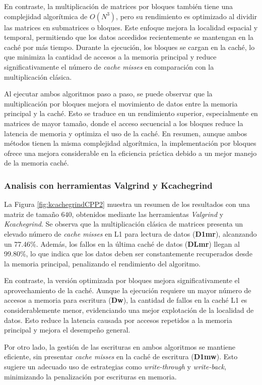 \documentclass[conference]{IEEEtran}
\begin{document}
En contraste, la multiplicación de matrices por bloques también tiene una complejidad algorítmica de \(O(N^3)\), pero su rendimiento es optimizado al dividir las matrices en submatrices o bloques. Este enfoque mejora la localidad espacial y temporal, permitiendo que los datos accedidos recientemente se mantengan en la caché por más tiempo. Durante la ejecución, los bloques se cargan en la caché, lo que minimiza la cantidad de accesos a la memoria principal y reduce significativamente el número de \textit{cache misses} en comparación con la multiplicación clásica.

Al ejecutar ambos algoritmos paso a paso, se puede observar que la multiplicación por bloques mejora el movimiento de datos entre la memoria principal y la caché. Esto se traduce en un rendimiento superior, especialmente en matrices de mayor tamaño, donde el acceso secuencial a los bloques reduce la latencia de memoria y optimiza el uso de la caché. En resumen, aunque ambos métodos tienen la misma complejidad algorítmica, la implementación por bloques ofrece una mejora considerable en la eficiencia práctica debido a un mejor manejo de la memoria caché.

\subsubsection{\textbf{Analisis con herramientas Valgrind y Kcachegrind}}


La Figura \ref{fig:kcachegrindCPP2} muestra un resumen de los resultados con una matriz de tamaño $640$, obtenidos mediante las herramientas \textit{Valgrind} y \textit{Kcachegrind}. Se observa que la multiplicación clásica de matrices presenta un elevado número de \textit{cache misses} en L1 para lectura de datos (\textbf{D1mr}), alcanzando un 77.46\%. Además, los fallos en la última caché de datos (\textbf{DLmr}) llegan al 99.80\%, lo que indica que los datos deben ser constantemente recuperados desde la memoria principal, penalizando el rendimiento del algoritmo.

En contraste, la versión optimizada por bloques mejora significativamente el aprovechamiento de la caché. Aunque la ejecución requiere un mayor número de accesos a memoria para escritura (\textbf{Dw}), la cantidad de fallos en la caché L1 es considerablemente menor, evidenciando una mejor explotación de la localidad de datos. Esto reduce la latencia causada por accesos repetidos a la memoria principal y mejora el desempeño general.

Por otro lado, la gestión de las escrituras en ambos algoritmos se mantiene eficiente, sin presentar \textit{cache misses} en la caché de escritura (\textbf{D1mw}). Esto sugiere un adecuado uso de estrategias como \textit{write-through} y \textit{write-back}, minimizando la penalización por escrituras en memoria.
\end{document}
